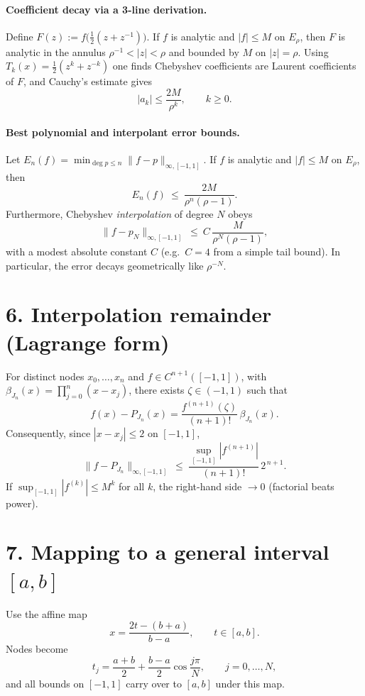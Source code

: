 \documentclass[11pt,a4paper]{article}
\theoremstyle{definition}
\theoremstyle{definition}
\theoremstyle{plain}
\theoremstyle{remark}
\begin{document}
\paragraph{Coefficient decay via a 3-line derivation.}
Define $F(z):=f\!\big(\tfrac12(z+z^{-1})\big)$. If $f$ is analytic and $|f|\le M$ on $E_\rho$, then
$F$ is analytic in the annulus $\rho^{-1}<|z|<\rho$ and bounded by $M$ on $|z|=\rho$.
Using $T_k(x)=\frac12(z^k+z^{-k})$ one finds Chebyshev coefficients are Laurent coefficients of $F$,
and Cauchy's estimate gives
\[
|a_k|\le \frac{2M}{\rho^k},\qquad k\ge 0.
\]

\paragraph{Best polynomial and interpolant error bounds.}
Let $E_n(f)=\min_{\deg p\le n}\|f-p\|_{\infty,[-1,1]}$. If $f$ is analytic and $|f|\le M$ on $E_\rho$,
then
\[
E_n(f)\ \le\ \frac{2M}{\rho^n(\rho-1)}.
\]
Furthermore, Chebyshev \emph{interpolation} of degree $N$ obeys
\[
\|f-p_N\|_{\infty,[-1,1]}\ \le\ C\,\frac{M}{\rho^N(\rho-1)},
\]
with a modest absolute constant $C$ (e.g.\ $C=4$ from a simple tail bound). In particular, the error decays
geometrically like $\rho^{-N}$.

\section*{6. Interpolation remainder (Lagrange form)}
For distinct nodes $x_0,\dots,x_n$ and $f\in C^{n+1}([-1,1])$, with 
$\displaystyle \beta_{J_n}(x)=\prod_{j=0}^{n}(x-x_j)$, there exists $\zeta\in(-1,1)$ such that
\[
f(x)-P_{J_n}(x)=\frac{f^{(n+1)}(\zeta)}{(n+1)!}\,\beta_{J_n}(x).
\]
Consequently, since $|x-x_j|\le 2$ on $[-1,1]$,
\[
\|f-P_{J_n}\|_{\infty,[-1,1]}\ \le\ \frac{\sup_{[-1,1]}|f^{(n+1)}|}{(n+1)!}\,2^{\,n+1}.
\]
If $\sup_{[-1,1]}|f^{(k)}|\le M^k$ for all $k$, the right-hand side $\to 0$ (factorial beats power).

\section*{7. Mapping to a general interval $[a,b]$}
Use the affine map
\[
x=\frac{2t-(b+a)}{b-a},\qquad t\in[a,b].
\]
Nodes become
\[
t_j=\frac{a+b}{2}+\frac{b-a}{2}\cos\frac{j\pi}{N},\qquad j=0,\dots,N,
\]
and all bounds on $[-1,1]$ carry over to $[a,b]$ under this map.
\end{document}
